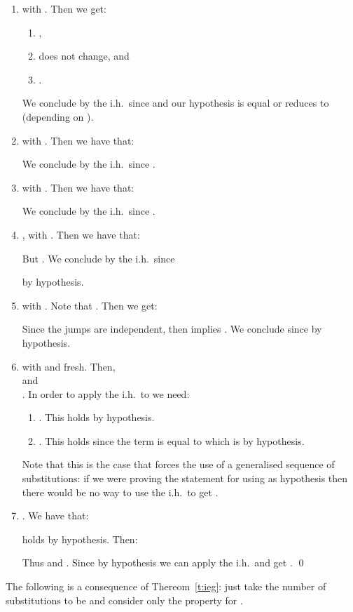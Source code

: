 \documentclass{LMCS}
\renewcommand{\>}{\rightarrow}
\newcommand{\ih}{i.h.}
\newcommand{\jump}{jump}
\begin{document}
\begin{enumerate}[]
\item  with .  Then we get:
  \begin{enumerate}[]
\item ,
 \item  does not change, and
 \item .
 \end{enumerate}
We conclude by the \ih\  since  and  our hypothesis  is equal or reduces to  (depending on ).


\item  with . Then we have that:

We conclude by the \ih\ since 
  .


\item  with .
 Then we have that:

We conclude by the \ih\ since 
  .


\item , with . Then we have that:

But .
We conclude by the \ih\ since 

by hypothesis.

\item 
with . Note that .  Then we get:

Since the \jump s
are independent, then  implies
.
   We conclude since  by hypothesis.


\item 
with  and  fresh. Then, \\ 
  and\\
. 
In order to apply the \ih\ to   we need:  
\begin{enumerate}[]
\item . This holds by hypothesis.
\item . 
This holds since the term is equal to  which is  by hypothesis.
\end{enumerate}

Note that this is the case that forces the
use of a  generalised sequence of substitutions: if we were proving the
statement for  using as hypothesis  then there
would be no way to use the \ih\ to get .

\item . We
     have that:
     
     holds by hypothesis. Then:

Thus  and . Since  by hypothesis we
can apply the \ih\ and get .
\qed\medskip
\end{enumerate}

\noindent The following is a consequence of Thereom~\ref{t:ieg}: just take
the number of substitutions  to be  and consider only
the  property for . 
\end{document}

